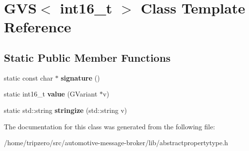 \hypertarget{classGVS_3_01int16__t_01_4}{\section{G\-V\-S$<$ int16\-\_\-t $>$ Class Template Reference}
\label{classGVS_3_01int16__t_01_4}
}
\subsection*{Static Public Member Functions}
\begin{DoxyCompactItemize}
\item 
\hypertarget{classGVS_3_01int16__t_01_4_a74fd2e54cfeebf2f87376b11a4d7b527}{static const char $\ast$ {\bfseries signature} ()}\label{classGVS_3_01int16__t_01_4_a74fd2e54cfeebf2f87376b11a4d7b527}

\item 
\hypertarget{classGVS_3_01int16__t_01_4_a3b5ee21a1f741c1543bf22738885e460}{static int16\-\_\-t {\bfseries value} (G\-Variant $\ast$v)}\label{classGVS_3_01int16__t_01_4_a3b5ee21a1f741c1543bf22738885e460}

\item 
\hypertarget{classGVS_3_01int16__t_01_4_a8ebde11ede44782a48dc2aecbbb5e3af}{static std\-::string {\bfseries stringize} (std\-::string v)}\label{classGVS_3_01int16__t_01_4_a8ebde11ede44782a48dc2aecbbb5e3af}

\end{DoxyCompactItemize}


The documentation for this class was generated from the following file\-:\begin{DoxyCompactItemize}
\item 
/home/tripzero/src/automotive-\/message-\/broker/lib/abstractpropertytype.\-h\end{DoxyCompactItemize}
